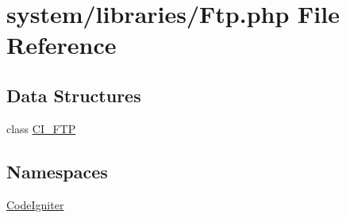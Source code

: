 \hypertarget{_ftp_8php}{}\section{system/libraries/\+Ftp.php File Reference}
\label{_ftp_8php}
\subsection*{Data Structures}
\begin{DoxyCompactItemize}
\item 
class \mbox{\hyperlink{class_c_i___f_t_p}{C\+I\+\_\+\+F\+TP}}
\end{DoxyCompactItemize}
\subsection*{Namespaces}
\begin{DoxyCompactItemize}
\item 
 \mbox{\hyperlink{namespace_code_igniter}{Code\+Igniter}}
\end{DoxyCompactItemize}
